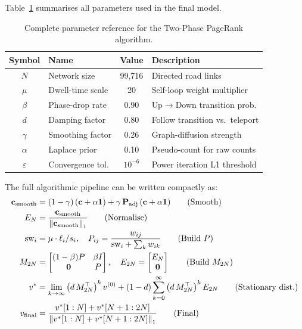 \documentclass[12pt,a4paper]{article}
\theoremstyle{definition}
\theoremstyle{plain}
\newcommand{\vf}{v_{\mathrm{final}}}
\newcommand{\sw}{\mathrm{sw}}
\newcommand{\norm}[1]{\left\|#1\right\|}
\begin{document}
Table~\ref{tab:params} summarises all parameters used in the final model.

\begin{table}[H]
  \centering
  \caption{Complete parameter reference for the Two-Phase PageRank algorithm.}
  \label{tab:params}
  \begin{tabular}{@{}clcp{5.2cm}@{}}
    \toprule
    Symbol & Name & Value & Description\\
    \midrule
    $N$ & Network size & 99{,}716 & Directed road links\\
    $\mu$ & Dwell-time scale & 20 & Self-loop weight multiplier\\
    $\beta$ & Phase-drop rate & 0.90 & Up$\to$Down transition prob.\\
    $d$ & Damping factor & 0.80 & Follow transition vs.\ teleport\\
    $\gamma$ & Smoothing factor & 0.26 & Graph-diffusion strength\\
    $\alpha$ & Laplace prior & 0.10 & Pseudo-count for raw counts\\
    $\varepsilon$ & Convergence tol. & $10^{-6}$ & Power iteration L1 threshold\\
    \bottomrule
  \end{tabular}
\end{table}

The full algorithmic pipeline can be written compactly as:
\begin{align}
  \mathbf{c}_{\text{smooth}} &= (1-\gamma)\,(\mathbf{c}+\alpha\mathbf{1})
    + \gamma\,\mathbf{P}_{\text{adj}}\,(\mathbf{c}+\alpha\mathbf{1}) \tag{Smooth}\\
  E_N &= \frac{\mathbf{c}_{\text{smooth}}}{\norm{\mathbf{c}_{\text{smooth}}}_1}
    \tag{Normalise}\\
  \sw_i &= \mu \cdot \ell_i / s_i, \quad
    P_{ij} = \frac{w_{ij}}{\sw_i + \sum_k w_{ik}} \tag{Build $P$}\\
  M_{2N} &= \begin{bmatrix}(1-\beta)P & \beta I\\ \mathbf{0} & P\end{bmatrix},
    \quad E_{2N} = \begin{bmatrix}E_N\\\mathbf{0}\end{bmatrix} \tag{Build $M_{2N}$}\\
  v^* &= \lim_{k\to\infty}
    \left(d\,M_{2N}^\top\right)^k v^{(0)} + (1-d)\sum_{k=0}^{\infty}
    \left(d\,M_{2N}^\top\right)^k E_{2N} \tag{Stationary dist.}\\
  \vf &= \frac{v^*[1:N] + v^*[N+1:2N]}{\norm{v^*[1:N] + v^*[N+1:2N]}_1} \tag{Final}
\end{align}
\end{document}
